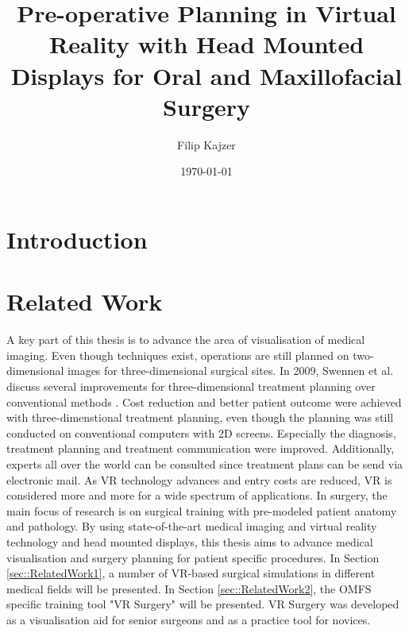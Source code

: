 \documentclass[twoside, parskip]{VRThesis} %
\title{Pre-operative Planning in Virtual Reality with Head Mounted Displays for Oral and Maxillofacial Surgery}
\author{Filip Kajzer}
\date{\today}
\begin{document}
\maketitle
\maketitleMaster %

\makestatement

\tableofcontents

\chapter{Introduction}



\chapter{Related Work}

A key part of this thesis is to advance the area of visualisation of medical imaging.
Even though techniques exist, operations are still planned on two-dimensional images for three-dimensional surgical sites.
In 2009, Swennen et al. discuss several improvements for three-dimensional treatment planning over conventional methods \cite{swennen2009three}.
Cost reduction and better patient outcome were achieved with three-dimenstional treatment planning, even though the planning was still conducted on conventional computers with 2D screens.
Especially the diagnosis, treatment planning and treatment communication were improved.
Additionally, experts all over the world can be consulted since treatment plans can be send via electronic mail.
As VR technology advances and entry costs are reduced, VR is considered more and more for a wide spectrum of applications.
In surgery, the main focus of research is on surgical training with pre-modeled patient anatomy and pathology.
By using state-of-the-art medical imaging and virtual reality technology and head mounted displays, this thesis aims to advance medical visualisation and surgery planning for patient specific procedures.
In Section \ref{sec::RelatedWork1}, a number of VR-based surgical simulations in different medical fields will be presented.
In Section \ref{sec::RelatedWork2}, the OMFS specific training tool "VR Surgery" will be presented.
VR Surgery was developed as a visualisation aid for senior surgeons and as a practice tool for novices.   
\end{document}
